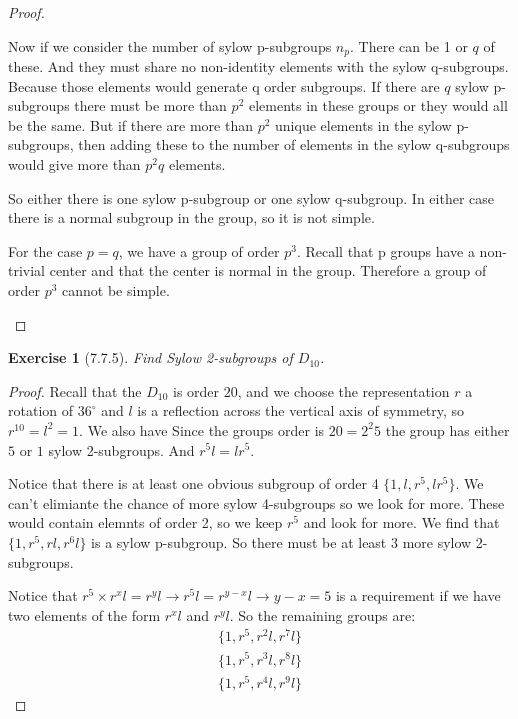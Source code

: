 \documentclass[12pt]{article}
\newtheorem*{exer}{Exercise}
\begin{document}
\begin{proof}
\begin{enumerate}
            Now if we consider the number of sylow p-subgroups $n_p$.
            There can be 1 or $q$ of these. And they must share no
            non-identity elements with the sylow q-subgroups. Because
            those elements would generate q order subgroups. If there
            are $q$ sylow p-subgroups there must be more than $p^2$
            elements in these groups or they would all be the same. But
            if there are more than $p^2$ unique elements in the sylow
            p-subgroups, then adding these to the number of elements in
            the sylow q-subgroups would give more than $p^2q$ elements.
            
            So either there is one sylow p-subgroup or one sylow
            q-subgroup. In either case there is a normal subgroup in the
            group, so it is not simple.

            For the case $p = q$, we have a group of order $p^3$. Recall
            that p groups have a non-trivial center and that the center
            is normal in the group. Therefore a group of order $p^3$
            cannot be simple.

    \end{enumerate}

\end{proof}


\begin{exer}[7.7.5]

    Find Sylow 2-subgroups of $D_{10}$.

\end{exer}

\begin{proof}

    Recall that the $D_{10}$ is order $20$, and we choose the
    representation $r$ a rotation of $36^\circ$ and $l$ is a reflection
    across the vertical axis of symmetry, so $r^{10} = l^2 = 1$. We also
    have Since the groups order is $20 = 2^2 5$ the group has either $5$
    or $1$ sylow 2-subgroups. And $r^5 l = l r^5$. 

    Notice that there is at least one obvious subgroup of order 4 $\{1,
    l, r^5, lr^5\}$. We can't elimiante the chance of more sylow
    4-subgroups so we look for more. These would contain elemnts of
    order 2, so we keep $r^5$ and look for more. We find that $\{1, r^5,
    rl, r^6l\}$ is a sylow p-subgroup. So there must be at least 3 more
    sylow 2-subgroups. 

    Notice that $r^5 \times r^xl = r^y l \rightarrow r^5 l =
    r^{y-x}l \rightarrow y - x = 5$ is a requirement if we have two
    elements of the form $r^xl$ and $r^y l$. So the remaining groups
    are:
    \begin{align*}
        \{1, r^5, r^2l, r^7l\} \\
        \{1, r^5, r^3l, r^8l\} \\
        \{1, r^5, r^4l, r^9l\}
    \end{align*}

\end{proof}
\end{document}
